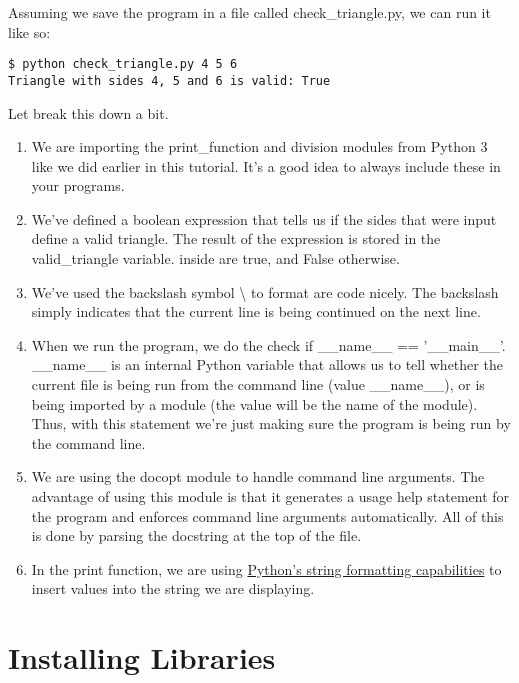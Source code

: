 Assuming we save the program in a file called check\_triangle.py, we can
run it like so:

\begin{verbatim}
$ python check_triangle.py 4 5 6
Triangle with sides 4, 5 and 6 is valid: True
\end{verbatim}

Let break this down a bit.

\begin{enumerate}
\tightlist
\item
  We are importing the print\_function and division modules from Python
  3 like we did earlier in this tutorial. It's a good idea to always
  include these in your programs.
\item
  We've defined a boolean expression that tells us if the sides that
  were input define a valid triangle. The result of the expression is
  stored in the valid\_triangle variable. inside are true, and False
  otherwise.
\item
  We've used the backslash symbol \textbackslash{} to format are code
  nicely. The backslash simply indicates that the current line is being
  continued on the next line.
\item
  When we run the program, we do the check if \_\_name\_\_ ==
  '\_\_main\_\_'. \_\_name\_\_ is an internal Python variable that
  allows us to tell whether the current file is being run from the
  command line (value \_\_name\_\_), or is being imported by a module
  (the value will be the name of the module). Thus, with this statement
  we're just making sure the program is being run by the command line.
\item
  We are using the docopt module to handle command line arguments. The
  advantage of using this module is that it generates a usage help
  statement for the program and enforces command line arguments
  automatically. All of this is done by parsing the docstring at the top
  of the file.
\item
  In the print function, we are using
  \href{https://docs.python.org/2/library/string.html\#format-string-syntax}{Python's
  string formatting capabilities} to insert values into the string we
  are displaying.
\end{enumerate}

\section{Installing Libraries}\label{installing-libraries}

